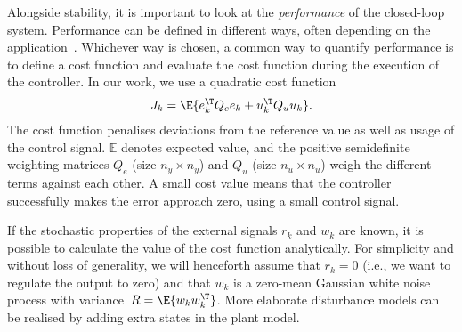 Alongside stability, it is important to look at the \emph{performance} of the closed-loop system.
Performance can be defined in different ways, often depending on the application~\cite{Astrom:2006}.
Whichever way is chosen, a common way to quantify performance is to define a cost function and evaluate the cost function during the execution of the controller.
In our work, we use a quadratic cost function
%
\begin{equation}
    \label{eq:cost}
    J_k = \E{e_k^\T Q_e e_k + u_k^\T Q_u u_k}.
\end{equation}
%
The cost function penalises deviations from the reference value as well as usage of the control signal.
$\mathbb{E}$ denotes expected value, and the positive semidefinite weighting matrices $Q_e$ (size $n_y \times n_y$) and $Q_u$ (size $n_u \times n_u$) weigh the different terms against each other.
A small cost value means that the controller successfully makes the error approach zero, using a small control signal.

If the stochastic properties of the external signals $r_k$ and $w_k$ are known, it is possible to calculate the value of the cost function analytically.
For simplicity and without loss of generality, we will henceforth assume that $r_k = 0$ (i.e., we want to regulate the output to zero) and that $w_k$ is a zero-mean Gaussian white noise process with variance~$R=\E{w_k w_k^\T}$.
More elaborate disturbance models can be realised by adding extra states in the plant model.

